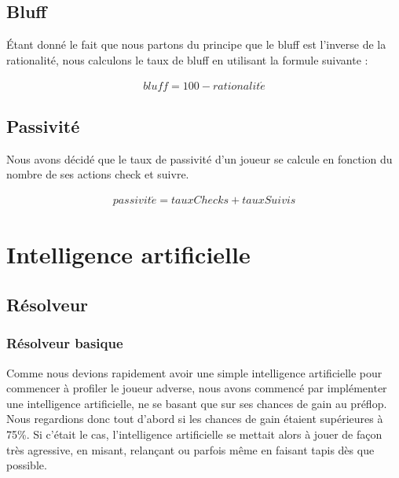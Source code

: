 \documentclass{report}
\begin{document}
\section{Bluff}

\hspace{0.5cm}Étant donné le fait que nous partons du principe que le bluff est l'inverse de la rationalité, nous calculons le taux de bluff en utilisant la formule suivante : \par

\begin{align*}
	bluff=100-rationalit\acute{e}
\end{align*}


\section{Passivité}

\hspace{0.5cm}Nous avons décidé que le taux de passivité d'un joueur se calcule en fonction du nombre de ses actions check et suivre.\par
\begin{align*}
	passivit\acute{e}=tauxChecks+tauxSuivis
\end{align*}


\chapter{Intelligence artificielle}
\section{Résolveur}
\subsection{Résolveur basique}


\hspace{0.5cm}Comme nous devions rapidement avoir une simple intelligence artificielle pour commencer à profiler le joueur adverse, nous avons commencé par implémenter une intelligence artificielle, ne se basant que sur ses chances de gain au préflop.\\

Nous regardions donc tout d'abord si les chances de gain étaient supérieures à 75\%. Si c'était le cas, l'intelligence artificielle se mettait alors à jouer de façon très agressive, en misant, relançant ou parfois même en faisant tapis dès que possible.\\
\end{document}
